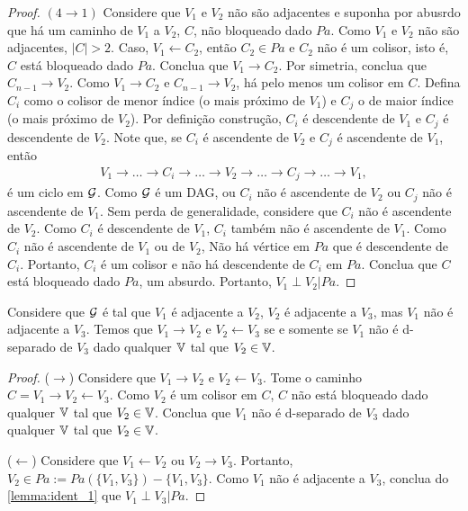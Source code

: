 \begin{proof}
 $(4 \rightarrow 1)$
 Considere que $V_1$ e $V_2$ não são adjacentes e
 suponha por abusrdo que 
 há um caminho de $V_1$ a $V_2$, $C$,
 não bloqueado dado $Pa$.
 Como $V_1$ e $V_2$ não são adjacentes, $|C| > 2$.
 Caso, $V_1 \leftarrow C_2$, então 
 $C_2 \in Pa$ e $C_2$ não é um colisor, isto é,
 $C$ está bloqueado dado $Pa$.
 Conclua que $V_1 \rightarrow C_2$.
 Por simetria, conclua que 
 $C_{n-1} \rightarrow V_2$.
 Como $V_1 \rightarrow C_2$ e
 $C_{n-1} \rightarrow V_2$, 
 há pelo menos um colisor em $C$.
 Defina $C_i$ como o colisor de menor índice
 (o mais próximo de $V_1$) e
 $C_j$ o de maior índice (o mais próximo de $V_2$).
 Por definição construção,
 $C_i$ é descendente de $V_1$ e
 $C_j$ é descendente de $V_2$.
 Note que, se $C_i$ é ascendente de $V_2$ e
 $C_j$ é ascendente de $V_1$, então
 \begin{align*}
  V_1 \rightarrow \ldots \rightarrow C_i
  \rightarrow \ldots \rightarrow V_2
  \rightarrow \ldots \rightarrow C_j
  \rightarrow \ldots \rightarrow V_1,
 \end{align*}
 é um ciclo em ${\mathcal G}$. Como ${\mathcal G}$ é um DAG,
 ou $C_i$ não é ascendente de $V_2$ ou
 $C_j$ não é ascendente de $V_1$.
 Sem perda de generalidade, considere que
 $C_i$ não é ascendente de $V_2$.
 Como $C_i$ é descendente de $V_1$,
 $C_i$ também não é ascendente de $V_1$.
 Como $C_i$ não é ascendente de $V_1$ ou de $V_2$,
 Não há vértice em $Pa$ que é descendente de $C_i$.
 Portanto, $C_i$ é um colisor e
 não há descendente de $C_i$ em $Pa$.
 Conclua que $C$ está bloqueado dado $Pa$, um absurdo.
 Portanto, $V_1 \perp V_2 | Pa$.
\end{proof}

\begin{lemma}
 \label{lemma:ident_2}
 Considere que ${\mathcal G}$ é tal que
 $V_1$ é adjacente a $V_2$,
 $V_2$ é adjacente a $V_3$, mas
 $V_1$ não é adjacente a $V_3$.
 Temos que $V_1 \rightarrow V_2$ e
 $V_2 \leftarrow V_3$ se e somente se
 $V_1$ não é d-separado de $V_3$ dado
 qualquer ${\mathbb V}$ tal que $V_2 \in {\mathbb V}$.
\end{lemma}

\begin{proof}
 ($\rightarrow$) Considere que $V_1 \rightarrow V_2$ e
 $V_2 \leftarrow V_3$. Tome o caminho
 $C = V_1 \rightarrow V_2 \leftarrow V_3$.
 Como $V_2$ é um colisor em $C$,
 $C$ não está bloqueado dado
 qualquer ${\mathbb V}$ tal que $V_2 \in {\mathbb V}$.
 Conclua que $V_1$ não é d-separado de $V_3$ dado
 qualquer ${\mathbb V}$ tal que $V_2 \in {\mathbb V}$.
 
 ($\leftarrow$)
 Considere que $V_1 \leftarrow V_2$ ou
 $V_2 \rightarrow V_3$. Portanto,
 $V_2 \in Pa := Pa(\{V_1,V_3\}) - \{V_1,V_3\}$.
 Como $V_1$ não é adjacente a $V_3$,
 conclua do \cref{lemma:ident_1} que
 $V_1 \perp V_3 | Pa$.
\end{proof}

